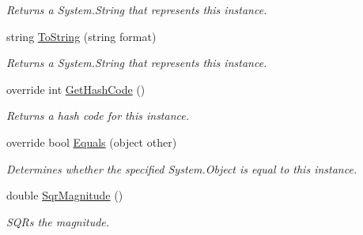 \begin{DoxyCompactItemize}
\begin{DoxyCompactList}\small\item\em Returns a System.\+String that represents this instance. \end{DoxyCompactList}\item 
string \hyperlink{struct_unity_engine_1_1_vector2d_aaad542045077ef1699a3299a29848100}{To\+String} (string format)
\begin{DoxyCompactList}\small\item\em Returns a System.\+String that represents this instance. \end{DoxyCompactList}\item 
override int \hyperlink{struct_unity_engine_1_1_vector2d_a936fb816c2313d3578248b643a9a1b8e}{Get\+Hash\+Code} ()
\begin{DoxyCompactList}\small\item\em Returns a hash code for this instance. \end{DoxyCompactList}\item 
override bool \hyperlink{struct_unity_engine_1_1_vector2d_ac2d4ae49abb2a99ca46344e9bce0afcb}{Equals} (object other)
\begin{DoxyCompactList}\small\item\em Determines whether the specified System.\+Object is equal to this instance. \end{DoxyCompactList}\item 
double \hyperlink{struct_unity_engine_1_1_vector2d_a4fbca0566c6b1e6b1f98dad63bfe63af}{Sqr\+Magnitude} ()
\begin{DoxyCompactList}\small\item\em S\+Q\+Rs the magnitude. \end{DoxyCompactList}\end{DoxyCompactItemize}
